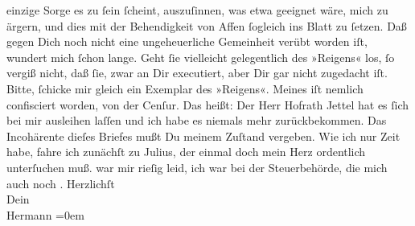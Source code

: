 \begin{ledgroupsized}[t]{13cm}
               einzige Sorge es zu ſein ſcheint, auszuſinnen, was etwa geeignet wäre, mich zu
               ärgern, und dies mit der Behendigkeit von Affen ſogleich ins Blatt zu ſetzen. Daß
               gegen Dich noch nicht eine ungeheuerliche Gemeinheit verübt worden iſt, wundert mich
               ſchon lange. Geht ſie vielleicht gelegentlich des »Reigens« los, ſo vergiß nicht, daß ſie, zwar an Dir executiert, aber Dir gar
               nicht zugedacht iſt.\pend
           \pstart
           Bitte, ſchicke mir gleich ein Exemplar des »Reigens«. Meines iſt nemlich confisciert {\pb}worden, von der Cenſur. Das heißt: Der Herr Hofrath Jettel hat es ſich bei mir ausleihen laſſen und ich habe es
               niemals mehr zurückbekommen.\pend
           \pstart
           Das Incohärente dieſes Briefes mußt Du meinem Zuſtand vergeben. Wie ich nur Zeit
               habe, fahre ich zunächſt zu Julius, der einmal
               doch mein Herz ordentlich unterſuchen muß.\pend
           \pstart
           \label{K_L01282_5v}\label{K_L01282_5h} war mir rieſig leid, ich war bei der Steuerbehörde, die mich auch noch
                  \label{K_L01282_6v}\label{K_L01282_6h}.\pend
           \pstart
           Herzlichſt{\\[\baselineskip]}Dein{\\[\baselineskip]}\spacefill\mbox{Hermann}\pend
           \leftskip=0em{}
         
         \endnumbering{}\end{ledgroupsized}  \newcommand{\dateiname}{L01282}\newcommand{\titel}{Hermann Bahr an Arthur Schnitzler, [29. 3. 1903?]}\newcommand{\editorInnen}{ Kurt Ifkovits,  Martin Anton Müller}
      